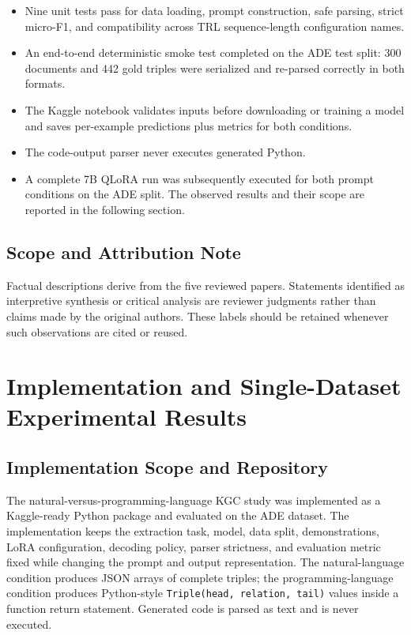 \documentclass[11pt]{article}
\begin{document}
\begin{itemize}
\item
  Nine unit tests pass for data loading, prompt construction, safe
  parsing, strict micro-F1, and compatibility across TRL sequence-length
  configuration names.
\item
  An end-to-end deterministic smoke test completed on the ADE test
  split: 300 documents and 442 gold triples were serialized and
  re-parsed correctly in both formats.
\item
  The Kaggle notebook validates inputs before downloading or training a
  model and saves per-example predictions plus metrics for both
  conditions.
\item
  The code-output parser never executes generated Python.
\item
  A complete 7B QLoRA run was subsequently executed for both prompt
  conditions on the ADE split. The observed results and their scope are
  reported in the following section.
\end{itemize}

\subsection{Scope and Attribution Note}\label{scope-and-attribution-note}

Factual descriptions derive from the five reviewed papers. Statements
identified as interpretive synthesis or critical analysis are reviewer
judgments rather than claims made by the original authors. These labels
should be retained whenever such observations are cited or reused.

\clearpage
\section{Implementation and Single-Dataset Experimental Results}
\label{implementation-and-single-dataset-experimental-results}

\subsection{Implementation Scope and Repository}
\label{implementation-scope-and-repository}

The natural-versus-programming-language KGC study was implemented as a
Kaggle-ready Python package and evaluated on the ADE dataset. The
implementation keeps the extraction task, model, data split,
demonstrations, LoRA configuration, decoding policy, parser strictness,
and evaluation metric fixed while changing the prompt and output
representation. The natural-language condition produces JSON arrays of
complete triples; the programming-language condition produces
Python-style \texttt{Triple(head, relation, tail)} values inside a
function return statement. Generated code is parsed as text and is never
executed.
\end{document}
